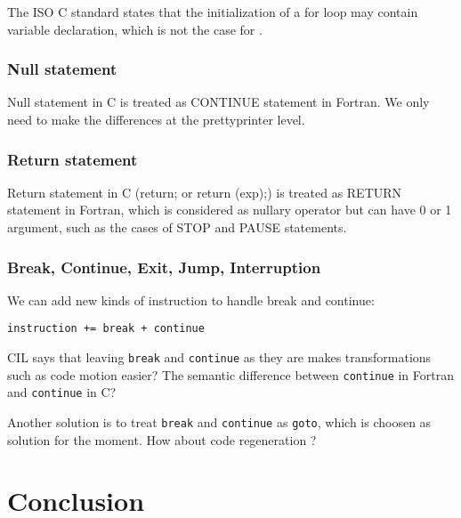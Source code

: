 \documentclass[a4paper]{article}
\begin{document}
The ISO C standard \cite{ISOC} states that
the initialization of a for loop may contain variable declaration, which
is not the case for \cite{Kern78}. 

\subsubsection{Null statement}
Null statement in C is treated as CONTINUE statement in Fortran. We only need to make the
differences at the prettyprinter level. 

\subsubsection{Return statement}
Return statement in C (return; or return (exp);) is treated as RETURN statement in Fortran, which is
considered as nullary operator but can have 0 or 1 argument, such as the
cases of STOP and PAUSE statements. 

\subsubsection{Break, Continue, Exit, Jump, Interruption}

We can add new kinds of instruction to handle break and continue: 

\verb/instruction += break + continue /

CIL says that leaving \verb/break/ and \verb/continue/ as they are  makes transformations such as code motion
easier? The semantic difference between \verb/continue/ in Fortran and
\verb/continue/ in C?

Another solution is to treat \verb/break/ and \verb/continue/ as
\verb/goto/, which is choosen as solution for the moment. How about code regeneration ?  

\section*{Conclusion}
\nocite{Kern78, Necu02}
\newpage
\end{document}
